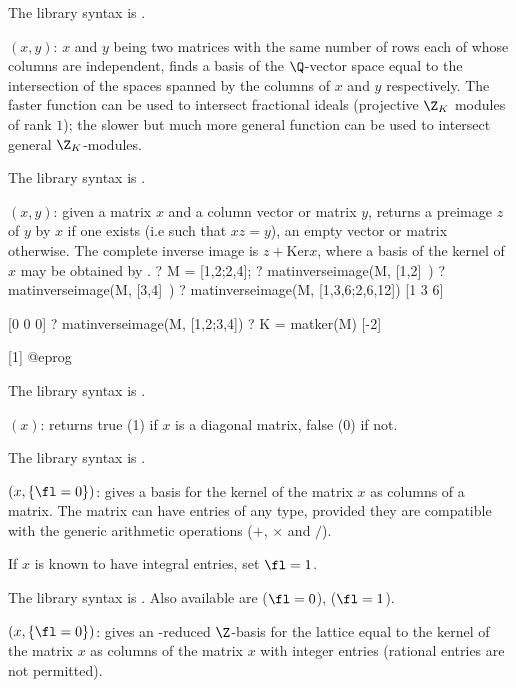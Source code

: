 The library syntax is .

$(x,y)$: \label{se:matintersect}$x$ and $y$ being two matrices with the same
number of rows each of whose columns are independent, finds a basis of the
$\Q$-vector space equal to the intersection of the spaces spanned by the
columns of $x$ and $y$ respectively. The faster function
 can be used to intersect fractional ideals (projective
$\Z_K$ modules of rank $1$); the slower but much more general function
 can be used to intersect general $\Z_K$-modules.

The library syntax is .

$(x,y)$: \label{se:matinverseimage}given a matrix $x$ and
a column vector or matrix $y$, returns a preimage $z$ of $y$ by $x$ if one
exists (i.e such that $x z = y$), an empty vector or matrix otherwise. The
complete inverse image is $z + \text{Ker} x$, where a basis of the kernel of
$x$ may be obtained by .
\bprog
? M = [1,2;2,4];
? matinverseimage(M, [1,2]~)
? matinverseimage(M, [3,4]~)
? matinverseimage(M, [1,3,6;2,6,12])
[1 3 6]

[0 0 0]
? matinverseimage(M, [1,2;3,4])
? K = matker(M)
[-2]

[1]
@eprog

The library syntax is .

$(x)$: \label{se:matisdiagonal}returns true (1) if $x$ is a diagonal matrix, false (0) if not.

The library syntax is .

$(x,\{\fl=0\})$: \label{se:matker}gives a basis for the kernel of the matrix $x$ as columns of a matrix.
The matrix can have entries of any type, provided they are compatible with
the generic arithmetic operations ($+$, $\times$ and $/$).

If $x$ is known to have integral entries, set $\fl=1$.

The library syntax is .
Also available are  ($\fl=0$),
 ($\fl=1$).

$(x,\{\fl=0\})$: \label{se:matkerint}gives an -reduced $\Z$-basis
for the lattice equal to the kernel of the matrix $x$ as columns of the
matrix $x$ with integer entries (rational entries are not permitted).

